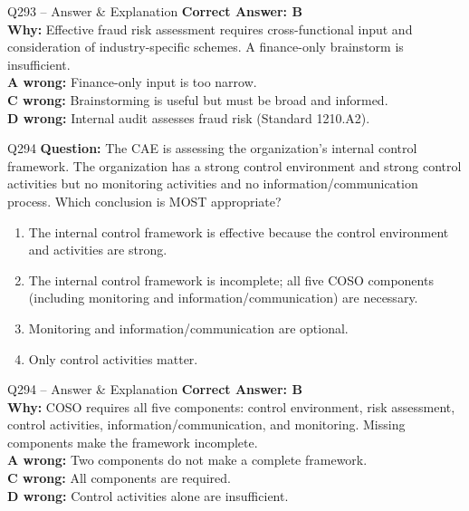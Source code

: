 \documentclass[aspectratio=169,10pt]{beamer}
\begin{document}
	\begin{frame}[t]{Q293 -- Answer \& Explanation}
		\small
		\textbf{Correct Answer: B} \\[4pt]
		\textbf{Why:} Effective fraud risk assessment requires cross-functional input and consideration of industry-specific schemes. A finance-only brainstorm is insufficient. \\[4pt]
		\textbf{A wrong:} Finance-only input is too narrow. \\[2pt]
		\textbf{C wrong:} Brainstorming is useful but must be broad and informed. \\[2pt]
		\textbf{D wrong:} Internal audit assesses fraud risk (Standard 1210.A2).
	\end{frame}
	
	\begin{frame}[t]{Q294}
		\small
		\textbf{Question:} The CAE is assessing the organization's internal control framework. The organization has a strong control environment and strong control activities but no monitoring activities and no information/communication process. Which conclusion is MOST appropriate?
		\begin{enumerate}[label=\Alph*.,itemsep=1pt,topsep=2pt]
			\item The internal control framework is effective because the control environment and activities are strong.
			\item The internal control framework is incomplete; all five COSO components (including monitoring and information/communication) are necessary.
			\item Monitoring and information/communication are optional.
			\item Only control activities matter.
		\end{enumerate}
	\end{frame}
	
	\begin{frame}[t]{Q294 -- Answer \& Explanation}
		\small
		\textbf{Correct Answer: B} \\[4pt]
		\textbf{Why:} COSO requires all five components: control environment, risk assessment, control activities, information/communication, and monitoring. Missing components make the framework incomplete. \\[4pt]
		\textbf{A wrong:} Two components do not make a complete framework. \\[2pt]
		\textbf{C wrong:} All components are required. \\[2pt]
		\textbf{D wrong:} Control activities alone are insufficient.
	\end{frame}
	
\end{document}
